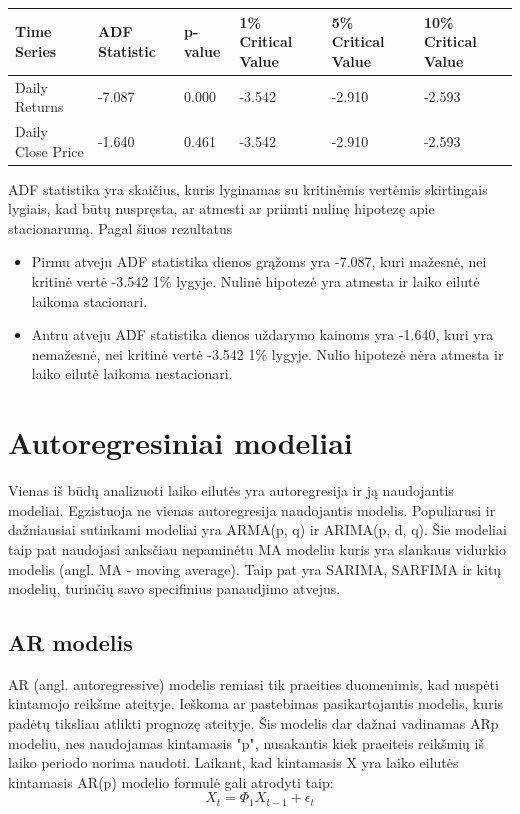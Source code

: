 \documentclass{VUMIFInfKursinis}
\begin{document}
\begin{tabularx}{\linewidth}{|X|X|X|X|X|X|}
  \hline
  \textbf{Time Series} & \textbf{ADF Statistic} & \textbf{p-value} & \textbf{1\% Critical Value} & \textbf{5\% Critical Value} & \textbf{10\% Critical Value} \\ \hline
  Daily Returns        & -7.087                 & 0.000            & -3.542                      & -2.910                      & -2.593                       \\ \hline
  Daily Close Price    & -1.640                 & 0.461            & -3.542                      & -2.910                      & -2.593                       \\ \hline
\end{tabularx}

\vspace{10pt}
ADF statistika yra skaičius, kuris lyginamas su kritinėmis vertėmis skirtingais lygiais, kad būtų nuspręsta, ar atmesti ar priimti nulinę hipotezę apie stacionarumą. Pagal šiuos rezultatus
\begin{itemize}
  \item Pirmu atveju ADF statistika dienos grąžoms yra -7.087, kuri mažesnė, nei kritinė vertė -3.542 1\% lygyje. Nulinė hipotezė yra atmesta ir laiko eilutė laikoma stacionari.
  \item Antru atveju ADF statistika dienos uždarymo kainoms yra -1.640, kuri yra nemažesnė, nei kritinė vertė -3.542 1\% lygyje. Nulio hipotezė nėra atmesta ir laiko eilutė laikoma nestacionari.
\end{itemize}

\section{Autoregresiniai modeliai}
Vienas iš būdų analizuoti laiko eilutės yra autoregresija ir ją naudojantis modeliai. Egzistuoja ne vienas autoregresija naudojantis modelis. 
Populiarusi ir dažniausiai sutinkami modeliai yra ARMA(p, q) ir ARIMA(p, d, q).
Šie modeliai taip pat naudojasi anksčiau nepaminėtu MA modeliu kuris yra slankaus vidurkio modelis (angl. MA - moving average).
Taip pat yra SARIMA, SARFIMA ir kitų modelių, turinčių savo specifinius panaudjimo atvejus. 

\subsection{AR modelis}
AR (angl. autoregressive) modelis remiasi tik praeities duomenimis, kad nuspėti kintamojo reikšme ateityje. Ieškoma ar pastebimas pasikartojantis
modelis, kuris padėtų tiksliau atlikti prognozę ateityje\cite{chi2018stock}. Šis modelis dar dažnai vadinamas ARp modeliu, nes naudojamas kintamasis "p", nusakantis kiek praeiteis reikšmių 
iš laiko periodo norima naudoti. Laikant, kad kintamasis X yra laiko eilutės kintamasis AR(p) modelio formulė gali atrodyti taip: 
\[X_{t} = \Phi _{1}X_{t-1}+\epsilon_{t} \]
\end{document}
